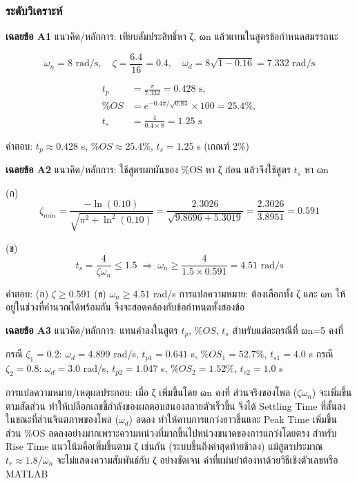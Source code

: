 \subsubsection{ระดับวิเคราะห์}

\textbf{เฉลยข้อ A1}
แนวคิด/หลักการ: เทียบสัมประสิทธิ์หา ζ, ωn แล้วแทนในสูตรข้อกำหนดสมรรถนะ

\[
\omega_n=8 \text{ rad/s}, \quad \zeta=\frac{6.4}{16}=0.4, \quad \omega_d=8\sqrt{1-0.16}=7.332 \text{ rad/s}
\]

\begin{align*}
t_p &= \frac{\pi}{7.332}=0.428 \text{ s},\\
\%OS &= e^{-0.4\pi/\sqrt{0.84}}\times100=25.4\%,\\
t_s &= \frac{4}{0.4\times8}=1.25 \text{ s}
\end{align*}

คำตอบ: $t_p\approx0.428$ s, $\%OS\approx25.4\%$, $t_s=1.25$ s (เกณฑ์ 2\%)

\textbf{เฉลยข้อ A2}
แนวคิด/หลักการ: ใช้สูตรผกผันของ \%OS หา ζ ก่อน แล้วจึงใช้สูตร $t_s$ หา ωn

(ก)
\[
\zeta_{min}=\frac{-\ln(0.10)}{\sqrt{\pi^2+\ln^2(0.10)}}=\frac{2.3026}{\sqrt{9.8696+5.3019}}=\frac{2.3026}{3.8951}=0.591
\]

(ข)
\[
t_s=\frac{4}{\zeta\omega_n}\le1.5 \;\Rightarrow\; \omega_n\ge\frac{4}{1.5\times0.591}=4.51 \text{ rad/s}
\]

คำตอบ: (ก) $\zeta\ge0.591$ (ข) $\omega_n\ge4.51$ rad/s
การแปลความหมาย: ต้องเลือกทั้ง ζ และ ωn ให้อยู่ในช่วงที่คำนวณได้พร้อมกัน จึงจะสอดคล้องกับข้อกำหนดทั้งสองข้อ

\textbf{เฉลยข้อ A3}
แนวคิด/หลักการ: แทนค่าลงในสูตร $t_p$, $\%OS$, $t_s$ สำหรับแต่ละกรณีที่ ωn=5 คงที่

กรณี $\zeta_1=0.2$: $\omega_d=4.899$ rad/s, $t_{p1}=0.641$ s, $\%OS_1=52.7\%$, $t_{s1}=4.0$ s
กรณี $\zeta_2=0.8$: $\omega_d=3.0$ rad/s, $t_{p2}=1.047$ s, $\%OS_2=1.52\%$, $t_{s2}=1.0$ s

การแปลความหมาย/เหตุผลประกอบ: เมื่อ ζ เพิ่มขึ้นโดย ωn คงที่ ส่วนจริงของโพล ($\zeta\omega_n$) จะเพิ่มขึ้นตามสัดส่วน ทำให้เปลือกเลขชี้กำลังของผลตอบสนองสลายตัวเร็วขึ้น จึงได้ Settling Time ที่สั้นลง ในขณะที่ส่วนจินตภาพของโพล ($\omega_d$) ลดลง ทำให้คาบการแกว่งยาวขึ้นและ Peak Time เพิ่มขึ้น ส่วน \%OS ลดลงอย่างมากเพราะความหน่วงที่มากขึ้นไปหน่วงขนาดของการแกว่งโดยตรง สำหรับ Rise Time แนวโน้มคือเพิ่มขึ้นตาม ζ เช่นกัน (ระบบขึ้นถึงค่าสุดท้ายช้าลง) แม้สูตรประมาณ $t_r\approx1.8/\omega_n$ จะไม่แสดงความสัมพันธ์กับ ζ อย่างชัดเจน ค่าที่แม่นยำต้องหาด้วยวิธีเชิงตัวเลขหรือ MATLAB

